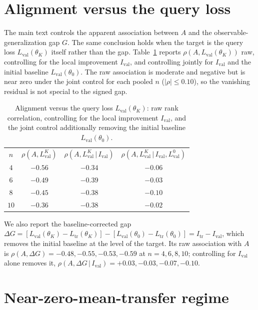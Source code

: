\documentclass[aps,pra,onecolumn,superscriptaddress,10pt]{revtex4-2}
\newcommand{\Itr}{I_{\mathrm{tr}}}
\newcommand{\Ival}{I_{\mathrm{val}}}
\newcommand{\thetaz}{\theta_0}
\newcommand{\thetaK}{\theta_K}
\newcommand{\Ltr}{L_{\mathrm{tr}}}
\newcommand{\Lval}{L_{\mathrm{val}}}
\begin{document}
\section{Alignment versus the query loss}
\label{sm:heldout}

The main text controls the apparent association between $A$ and the observable-generalization gap
$G$. The same conclusion holds when the target is the query loss $\Lval(\thetaK)$ itself rather
than the gap. Table~\ref{tab:heldout} reports $\rho(A,\Lval(\thetaK))$ raw, controlling for the local
improvement $\Ival$, and controlling jointly for $\Ival$ and the initial baseline $\Lval(\thetaz)$.
The raw association is moderate and negative but is near zero under the joint control for each pooled $n$
($|\rho|\le0.10$), so the vanishing residual is not special to the signed gap.

\begin{table}[h]
\caption{\label{tab:heldout}%
Alignment versus the query loss $\Lval(\thetaK)$: raw rank correlation, controlling for the local
improvement $\Ival$, and the joint control additionally removing the initial baseline
$\Lval(\thetaz)$.}
\begin{ruledtabular}
\begin{tabular}{cccc}
$n$ & $\rho(A,\Lval^{K})$ & $\rho(A,\Lval^{K}\,|\,\Ival)$ & $\rho(A,\Lval^{K}\,|\,\Ival,\Lval^{0})$ \\
\colrule
$4$  & $-0.56$ & $-0.34$ & $-0.06$ \\
$6$  & $-0.49$ & $-0.39$ & $-0.03$ \\
$8$  & $-0.45$ & $-0.38$ & $-0.10$ \\
$10$ & $-0.36$ & $-0.38$ & $-0.02$ \\
\end{tabular}
\end{ruledtabular}
\end{table}

We also report the baseline-corrected gap $\Delta G=[\Lval(\thetaK)-\Ltr(\thetaK)]-
[\Lval(\thetaz)-\Ltr(\thetaz)]=\Itr-\Ival$, which removes the initial baseline at the level of the
target. Its raw association with $A$ is $\rho(A,\Delta G)=-0.48,-0.55,-0.53,-0.59$ at $n=4,6,8,10$;
controlling for $\Ival$ alone removes it, $\rho(A,\Delta G\,|\,\Ival)=+0.03,-0.03,-0.07,-0.10$.

\section{Near-zero-mean-transfer regime}
\label{sm:transfer}
\end{document}
